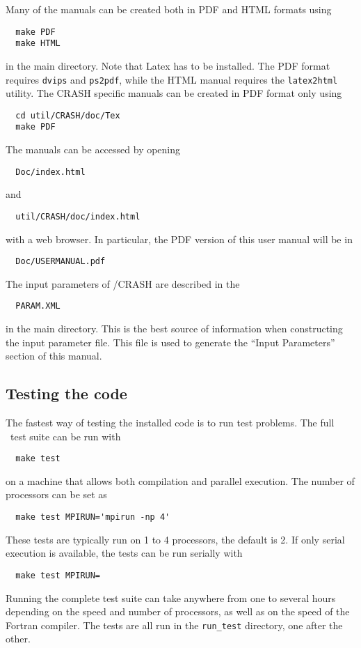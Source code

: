Many of the manuals can be created both in PDF and HTML formats using
\begin{verbatim}
  make PDF
  make HTML
\end{verbatim}
in the main directory. Note that Latex has to be installed. 
The PDF format requires {\tt dvips} and {\tt ps2pdf}, while the HTML manual requires the
{\tt latex2html} utility. The CRASH specific manuals can be created in PDF format only using
\begin{verbatim}
  cd util/CRASH/doc/Tex
  make PDF
\end{verbatim}
The manuals can be accessed by opening 
\begin{verbatim}
  Doc/index.html
\end{verbatim}
and
\begin{verbatim}
  util/CRASH/doc/index.html
\end{verbatim}
with a web browser. In particular, the PDF version of this user manual will be in
\begin{verbatim}
  Doc/USERMANUAL.pdf
\end{verbatim}
The input parameters of \BATSRUS/CRASH are described in the
\begin{verbatim}
  PARAM.XML
\end{verbatim}
in the main directory. This is the best source of information when constructing the input
parameter file. This file is used to generate the ``Input Parameters'' section of this manual.

\subsection{Testing the code}

The fastest way of testing the installed code is to run test problems.
The full \BATSRUS\ test suite can be run with
\begin{verbatim}
  make test
\end{verbatim}
on a machine that allows both compilation and parallel execution. 
The number of processors can be set as
\begin{verbatim}
  make test MPIRUN='mpirun -np 4'
\end{verbatim}
These tests are typically run on 1 to 4 processors, the default is 2.
If only serial execution is available, the tests can be run serially with
\begin{verbatim}
  make test MPIRUN=
\end{verbatim}
Running the complete test suite can take anywhere from one to several
hours depending on the speed and number of processors, as well as on
the speed of the Fortran compiler. The tests are all run in the 
{\tt run\_test} directory, one after the other.

